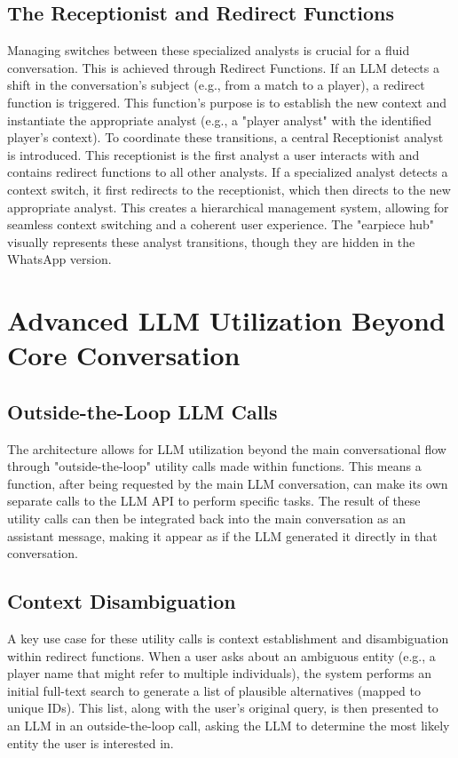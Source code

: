 \documentclass{article}
\begin{document}
\subsection{The Receptionist and Redirect Functions}
Managing switches between these specialized analysts is crucial for a fluid conversation. This is achieved through Redirect Functions. If an LLM detects a shift in the conversation's subject (e.g., from a match to a player), a redirect function is triggered. This function's purpose is to establish the new context and instantiate the appropriate analyst (e.g., a "player analyst" with the identified player's context). To coordinate these transitions, a central Receptionist analyst is introduced. This receptionist is the first analyst a user interacts with and contains redirect functions to all other analysts. If a specialized analyst detects a context switch, it first redirects to the receptionist, which then directs to the new appropriate analyst. This creates a hierarchical management system, allowing for seamless context switching and a coherent user experience. The "earpiece hub" visually represents these analyst transitions, though they are hidden in the WhatsApp version.

\section{Advanced LLM Utilization Beyond Core Conversation}


\subsection{Outside-the-Loop LLM Calls}
The architecture allows for LLM utilization beyond the main conversational flow through "outside-the-loop" utility calls made within functions. This means a function, after being requested by the main LLM conversation, can make its own separate calls to the LLM API to perform specific tasks. The result of these utility calls can then be integrated back into the main conversation as an assistant message, making it appear as if the LLM generated it directly in that conversation.

\subsection{Context Disambiguation}
A key use case for these utility calls is context establishment and disambiguation within redirect functions. When a user asks about an ambiguous entity (e.g., a player name that might refer to multiple individuals), the system performs an initial full-text search to generate a list of plausible alternatives (mapped to unique IDs). This list, along with the user's original query, is then presented to an LLM in an outside-the-loop call, asking the LLM to determine the most likely entity the user is interested in.
\end{document}
